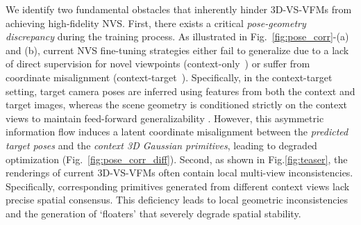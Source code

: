We identify two fundamental obstacles that inherently hinder 3D-VS-VFMs from achieving high-fidelity NVS. First, there exists a critical \textit{pose-geometry discrepancy} during the training process. 
As illustrated in Fig.~\ref{fig:pose_corr}-(a) and (b), current NVS fine-tuning strategies either fail to generalize due to a lack of direct supervision for novel viewpoints (context-only~\cite{jiang2025anysplat}) or suffer from coordinate misalignment (context-target~\cite{huang2025no}).
Specifically, in the context-target setting, target camera poses are inferred using features from both the context and target images, whereas the scene geometry is conditioned strictly on the context views to maintain feed-forward generalizability \cite{huang2025no}.
However, this asymmetric information flow induces a latent coordinate misalignment between the \textit{predicted target poses} and the \textit{context 3D Gaussian primitives}, leading to degraded optimization (Fig.~\ref{fig:pose_corr_diff}). 
Second, as shown in Fig.\ref{fig:teaser}, the renderings of current 3D-VS-VFMs often contain local multi-view inconsistencies. Specifically, corresponding primitives generated from different context views lack precise spatial consensus. This deficiency leads to local geometric inconsistencies and the generation of `floaters' that severely degrade spatial stability. 


